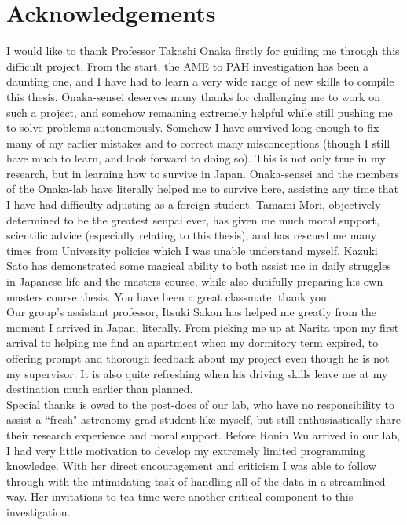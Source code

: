\chapter*{Acknowledgements}
     I would like to thank Professor Takashi Onaka firstly for guiding me through this difficult project. From the start, the AME to PAH investigation has been a daunting one, and I have had to learn a very wide range of new skills to compile this thesis. Onaka-sensei deserves many thanks for challenging me to work on such a project, and somehow remaining extremely helpful while still pushing me to solve problems autonomously. Somehow I have survived long enough to fix many of my earlier mistakes and to correct many misconceptions (though I still have much to learn, and look forward to doing so). This is not only true in my research, but in learning how to survive in Japan. Onaka-sensei and the members of the Onaka-lab have literally helped me to survive here, assisting any time that I have had difficulty adjusting as a foreign student. Tamami Mori, objectively determined to be the greatest senpai ever, has given me much moral support, scientific advice (especially relating to this thesis), and has rescued me many times from University policies which I was unable understand myself. Kazuki Sato has demonstrated some magical ability to both assist me in daily struggles in Japanese life and the masters course, while also dutifully preparing his own masters course thesis. You have been a great classmate, thank you. \\
     Our group's assistant professor, Itsuki Sakon has helped me greatly from the moment I arrived in Japan, literally. From picking me up at Narita upon my first arrival to helping me find an apartment when my dormitory term expired, to offering prompt and thorough feedback about my project even though he is not my supervisor. It is also quite refreshing when his driving skills leave me at my destination much earlier than planned.\\
     Special thanks is owed to the post-docs of our lab, who have no responsibility to assist a ``fresh" astronomy grad-student like myself, but still enthusiastically share their research experience and moral support. Before Ronin Wu arrived in our lab, I had very little motivation to develop my extremely limited programming knowledge. With her direct encouragement and criticism I was able to follow through with the intimidating task of handling all of the data in a streamlined way. Her invitations to tea-time were another critical component to this investigation.\\
